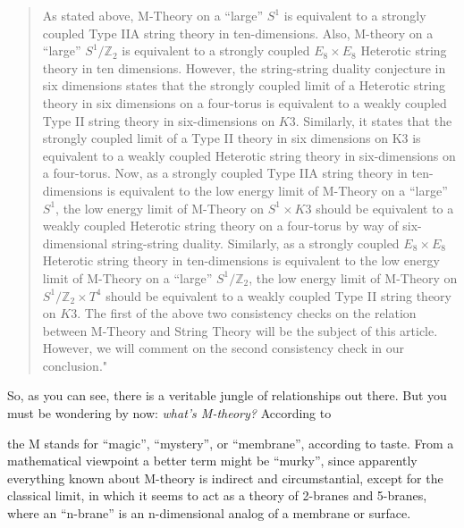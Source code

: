 \documentclass{article}
\def\tightlist{}
\renewcommand{\texttt}[1]{%
  \begingroup
  \ttfamily
  \begingroup\lccode`~=`/\lowercase{\endgroup\def~}{/\discretionary{}{}{}}%
  \begingroup\lccode`~=`[\lowercase{\endgroup\def~}{[\discretionary{}{}{}}%
  \begingroup\lccode`~=`.\lowercase{\endgroup\def~}{.\discretionary{}{}{}}%
  \catcode`/=\active\catcode`[=\active\catcode`.=\active
  \scantokens{#1\noexpand}%
  \endgroup
}
\begin{document}
\begin{quote}
As stated above, M-Theory on a ``large'' \(S^1\) is equivalent to a
strongly coupled Type IIA string theory in ten-dimensions. Also,
M-theory on a ``large'' \(S^1/\mathbb{Z}_2\) is equivalent to a strongly
coupled \(E_8 \times E_8\) Heterotic string theory in ten dimensions.
However, the string-string duality conjecture in six dimensions states
that the strongly coupled limit of a Heterotic string theory in six
dimensions on a four-torus is equivalent to a weakly coupled Type II
string theory in six-dimensions on \(K3\). Similarly, it states that the
strongly coupled limit of a Type II theory in six dimensions on K3 is
equivalent to a weakly coupled Heterotic string theory in six-dimensions
on a four-torus. Now, as a strongly coupled Type IIA string theory in
ten-dimensions is equivalent to the low energy limit of M-Theory on a
``large'' \(S^1\), the low energy limit of M-Theory on \(S^1 \times K3\)
should be equivalent to a weakly coupled Heterotic string theory on a
four-torus by way of six-dimensional string-string duality. Similarly,
as a strongly coupled \(E_8 \times E_8\) Heterotic string theory in
ten-dimensions is equivalent to the low energy limit of M-Theory on a
``large'' \(S^1/\mathbb{Z}_2\), the low energy limit of M-Theory on
\(S^1/\mathbb{Z}_2 \times T^4\) should be equivalent to a weakly coupled
Type II string theory on \(K3\). The first of the above two consistency
checks on the relation between M-Theory and String Theory will be the
subject of this article. However, we will comment on the second
consistency check in our conclusion."
\end{quote}

So, as you can see, there is a veritable jungle of relationships out
there. But you must be wondering by now: \emph{what's M-theory?}
According to


the M stands for ``magic'', ``mystery'', or ``membrane'', according to
taste. From a mathematical viewpoint a better term might be ``murky'',
since apparently everything known about M-theory is indirect and
circumstantial, except for the classical limit, in which it seems to act
as a theory of 2-branes and 5-branes, where an ``n-brane'' is an
n-dimensional analog of a membrane or surface.
\end{document}
